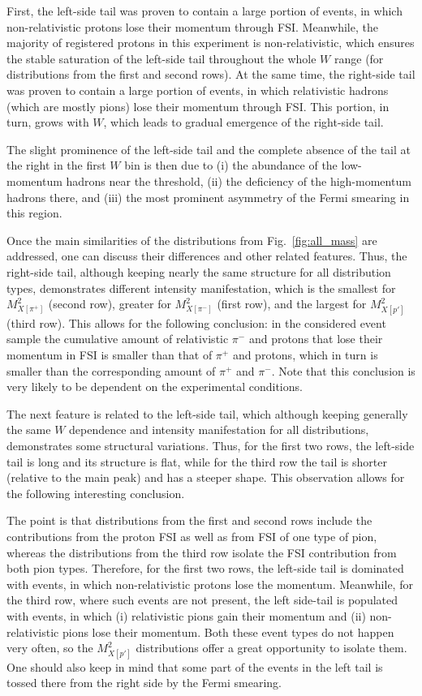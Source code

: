 First, the left-side tail was proven to contain a large portion of events, in which non-relativistic protons lose their momentum through FSI. Meanwhile, the majority of registered protons in this experiment is non-relativistic, which ensures the stable saturation of the left-side tail throughout the whole $W$ range (for distributions from the first and second rows). At the same time, the right-side tail was proven to contain a large portion of events, in which relativistic hadrons (which are mostly pions) lose their momentum through FSI. This portion, in turn, grows with $W$, which leads to gradual emergence of the right-side tail. %


The slight prominence of the left-side tail and the complete absence of the tail at the right in the first $W$ bin is then due to (i) the abundance of the low-momentum hadrons near the threshold, (ii) the deficiency of the high-momentum hadrons there, and (iii) the most prominent asymmetry of the Fermi smearing in this region.


Once the main similarities of the distributions from Fig.~\ref{fig:all_mass} are addressed, one can discuss their differences and other related features. Thus, the right-side tail, although keeping nearly the same structure for all distribution types, demonstrates different intensity manifestation, which is the smallest for $M^{2}_{X[\pi^{+}]}$ (second row), greater for $M^{2}_{X[\pi^{-}]}$ (first row), and the largest for $M^{2}_{X[p']}$ (third row). This allows for the following conclusion: in the considered event sample the cumulative amount of relativistic $\pi^{-}$ and protons that lose their momentum in FSI is smaller than that of $\pi^{+}$ and protons, which in turn is smaller than the corresponding amount of $\pi^{+}$ and $\pi^{-}$. Note that this conclusion is very likely to be dependent on the experimental conditions.

The next feature is related to the left-side tail, which although keeping generally the same $W$ dependence and intensity manifestation for all distributions, demonstrates some structural variations. Thus, for the first two rows, the left-side tail is long and its structure is flat, while for the third row the tail is shorter (relative to the main peak) and has a steeper shape. This observation allows for the following interesting conclusion. 


The point is that distributions from the first and second rows include the contributions from the proton FSI as well as from FSI of one type of pion, whereas the distributions from the third row isolate the FSI contribution from both pion types. Therefore, for the first two rows, the left-side tail is dominated with events, in which non-relativistic protons lose the momentum. Meanwhile, for the third row, where such events are not present, the left side-tail is populated with events, in which (i)  relativistic pions gain their momentum and (ii) non-relativistic pions lose their momentum. Both these event types do not happen very often, so the $M^{2}_{X[p']}$ distributions offer a great opportunity to isolate them. One should also keep in mind that some part of the events in the left tail is tossed there from the right side by the Fermi smearing.

